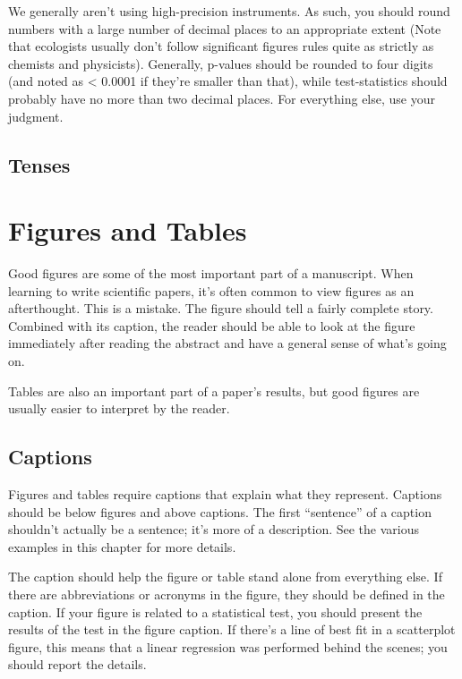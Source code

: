 \documentclass[]{book}
\begin{document}
We generally aren't using high-precision instruments. As such, you
should round numbers with a large number of decimal places to an
appropriate extent (Note that ecologists usually don't follow
significant figures rules quite as strictly as chemists and physicists).
Generally, p-values should be rounded to four digits (and noted as
\textless{} 0.0001 if they're smaller than that), while test-statistics
should probably have no more than two decimal places. For everything
else, use your judgment.

\section{Tenses}\label{tenses}

\chapter{Figures and Tables}\label{figures}

Good figures are some of the most important part of a manuscript. When
learning to write scientific papers, it's often common to view figures
as an afterthought. This is a mistake. The figure should tell a fairly
complete story. Combined with its caption, the reader should be able to
look at the figure immediately after reading the abstract and have a
general sense of what's going on.

Tables are also an important part of a paper's results, but good figures
are usually easier to interpret by the reader.

\section{Captions}\label{captions}

Figures and tables require captions that explain what they represent.
Captions should be below figures and above captions. The first
``sentence'' of a caption shouldn't actually be a sentence; it's more of
a description. See the various examples in this chapter for more
details.

The caption should help the figure or table stand alone from everything
else. If there are abbreviations or acronyms in the figure, they should
be defined in the caption. If your figure is related to a statistical
test, you should present the results of the test in the figure caption.
If there's a line of best fit in a scatterplot figure, this means that a
linear regression was performed behind the scenes; you should report the
details.
\end{document}
